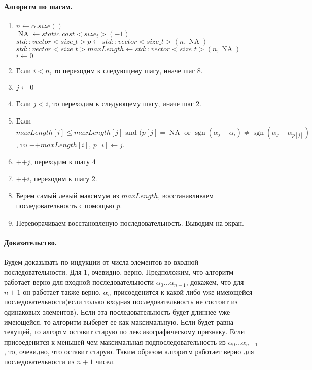 \documentclass[12pt]{article}
\newcommand{\sgn}{\operatorname{sgn}}
\newcommand{\NA}{\operatorname{NA}}
\begin{document}
\paragraph{Алгоритм по шагам.}
\begin{enumerate}
    \item $ n \leftarrow \alpha.size() $ \\
          $ \NA \leftarrow static\_cast<size_t> (-1)$ \\
          $ std::vector<size\_t> p \leftarrow std::vector<size\_t>(n, \NA) $ \\
          $ std::vector<size\_t> maxLength \leftarrow std::vector<size\_t>(n, \NA)$
          $ i \leftarrow 0 $
    \item Если $ i < n $, то переходим к следующему шагу, иначе шаг 8.
    \item $ j \leftarrow 0 $
    \item Если $ j < i $, то переходим к следующему шагу, иначе шаг 2.
    \item Если $ maxLength[i] \le maxLength[j] \mbox{   and   } (p[j] = \NA \mbox{   or   } \sgn(\alpha_j - \alpha_i) \ne \sgn(\alpha_j - \alpha_{p[j]}) $,
          то ++$maxLength[i]$, $ p[i] \leftarrow j $.
    \item ++$j$, переходим к шагу 4
    \item ++$i$, переходим к шагу 2.
    \item Берем самый левый максимум из $ maxLength $, восстанавливаем последовательность с помощью $ p $.
    \item Переворачиваем восстановленую последовательность. Выводим на экран.
\end{enumerate}


\paragraph{Доказательство.}
Будем доказывать по индукции от числа элементов во входной последовательности. Для 1, очевидно, верно.
Предположим, что алгоритм работает верно для входной последовательности $ \alpha_0 \dots \alpha_{n - 1} $,
докажем, что для $ n + 1 $ он работает также верно.
$\alpha_n$ присоеденится к какой-либо уже имеющейся последовательности(если только входная последовательность
не состоит из одинаковых элементов). Если эта последовательность будет длиннее уже имеющейся, то алгоритм
выберет ее как максимальную. Если будет равна текущей, то алгортм оставит старую по лексикографическому
признаку. Если присоеденится к меньшей чем максимальная подпоследовательность из $ \alpha_0 \dots \alpha_{n - 1} $,
то, очевидно, что оставит старую. Таким образом алгоритм работает верно для последовательности из $ n + 1 $ чисел.
\end{document}
